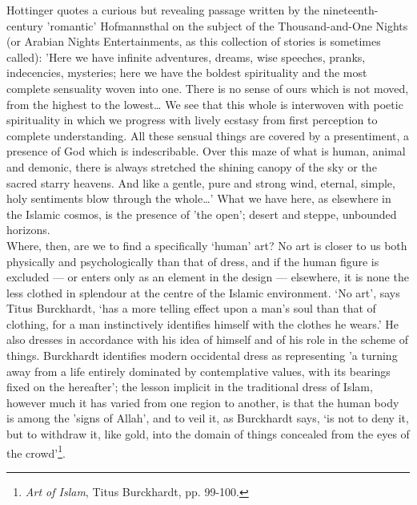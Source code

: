 \documentclass[10pt, twoside,openright]{book}
\begin{document}
Hottinger quotes a curious but revealing passage written by the nineteenth\hyp{}century 'romantic' 
Hofmannsthal on the subject of the Thousand\hyp{}and\hyp{}One Nights (or Arabian Nights Entertainments, as this 
collection of stories is sometimes called): 'Here we have infinite adventures, dreams, wise speeches, 
pranks, indecencies, mysteries; here we have the boldest spirituality and the most complete 
sensuality woven into one. There is no sense of ours which is not moved, from the highest to the 
lowest\ldots{} We see that this whole is interwoven with poetic spirituality in which we progress with 
lively ecstasy from first perception to complete understanding. All these sensual things are covered 
by a presentiment, a presence of God which is indescribable. Over this maze of what is human, animal 
and demonic, there is always stretched the shining canopy of the sky or the sacred starry heavens. 
And like a gentle, pure and strong wind, eternal, simple, holy sentiments blow through the whole\ldots{}' 
What we have here, as elsewhere in the Islamic cosmos, is the presence of 'the open'; desert and 
steppe, unbounded horizons. \\

Where, then, are we to find a specifically `human' art? No art is closer to us both physically and 
psychologically than that of dress, and if the human figure is excluded --- or enters only as an 
element in the design --- elsewhere, it is none the less clothed in splendour at the centre of the 
Islamic environment. `No art', says Titus Burckhardt, `has a more telling effect upon a man's soul 
than that of clothing, for a man instinctively identifies himself with the clothes he wears.' He also 
dresses in accordance with his idea of himself and of his role in the scheme of things. Burckhardt 
identifies modern occidental dress as representing 'a turning away from a life entirely dominated by 
contemplative values, with its bearings fixed on the hereafter'; the lesson implicit in the 
traditional dress of Islam, however much it has varied from one region to another, is that the human 
body is among the 'signs of Allah', and to veil it, as Burckhardt says, `is not to deny it, but to 
withdraw it, like gold, into the domain of things concealed from the eyes of the crowd'\footnote{\emph{Art of Islam}, Titus Burckhardt, pp. 99-100.}. \\
\end{document}

